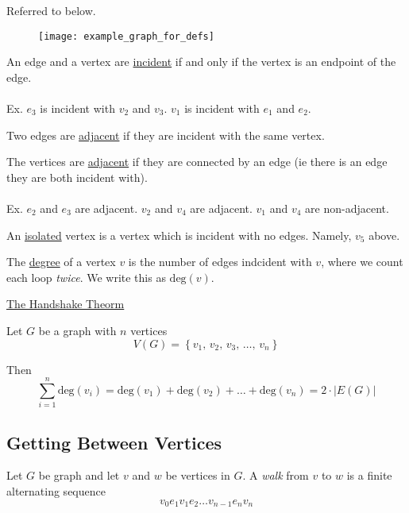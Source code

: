 \begin{example}
    Referred to below.
    \begin{figure}[H]
        \centering
        \texttt{[image: example\_graph\_for\_defs]}
    \end{figure}
\end{example}

\begin{definition}
    An edge and a vertex are \underline{incident} if and only if the vertex is an endpoint of the edge.
    \\ \\
    Ex. $e_3$ is incident with $v_2$ and $v_3$. $v_1$ is incident with $e_1$ and $e_2$.
\end{definition}

\begin{definition}
    Two edges are \underline{adjacent} if they are incident with the same vertex.

    The vertices are \underline{adjacent} if they are connected by an edge (ie there is an edge they are both incident with).
    \\ \\
    Ex. $e_2$ and $e_3$ are adjacent. $v_2$ and $v_4$ are adjacent. $v_1$ and $v_4$ are non-adjacent.
\end{definition}

\begin{definition}
    An \underline{isolated} vertex is a vertex which is incident with no edges. Namely, $v_5$ above.
\end{definition}

\begin{definition}
    The \underline{degree} of a vertex $v$ is the number of edges indcident with $v$, where we count each loop \emph{twice}. We write this as $\text{deg}(v)$.
\end{definition}

\begin{theorm}
    \underline{The Handshake Theorm}

    Let $G$ be a graph with $n$ vertices $$V(G) = \left\{v_1,\,v_2,\,v_3,\,\dots,\,v_n\right\}$$

    Then $$\sum_{i=1}^n \text{deg}(v_i) = \text{deg}(v_1) + \text{deg}(v_2) + \dots + \text{deg}(v_n) = 2 \cdot |E(G)|$$
\end{theorm}

\subsection{Getting Between Vertices}
Let $G$ be graph and let $v$ and $w$ be vertices in $G$. A \emph{walk} from $v$ to $w$ is a finite alternating sequence 
\begin{equation}
    v_0 e_1 v_1 e_2 \dots v_{n-1}e_n v_n
\end{equation}

